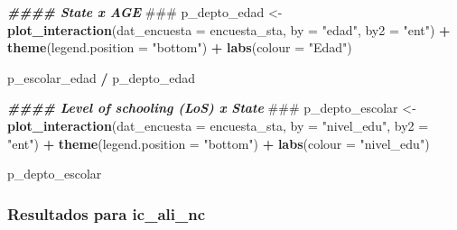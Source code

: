 \documentclass[
  12pt,
]{book}
\newenvironment{Shaded}{\begin{snugshade}}{\end{snugshade}}
\newcommand{\AlertTok}[1]{\textcolor[rgb]{0.94,0.16,0.16}{#1}}
\newcommand{\AttributeTok}[1]{\textcolor[rgb]{0.13,0.29,0.53}{#1}}
\newcommand{\DocumentationTok}[1]{\textcolor[rgb]{0.56,0.35,0.01}{\textbf{\textit{#1}}}}
\newcommand{\FunctionTok}[1]{\textcolor[rgb]{0.13,0.29,0.53}{\textbf{#1}}}
\newcommand{\NormalTok}[1]{#1}
\newcommand{\OtherTok}[1]{\textcolor[rgb]{0.56,0.35,0.01}{#1}}
\newcommand{\SpecialCharTok}[1]{\textcolor[rgb]{0.81,0.36,0.00}{\textbf{#1}}}
\newcommand{\StringTok}[1]{\textcolor[rgb]{0.31,0.60,0.02}{#1}}
\begin{document}
\begin{Shaded}
\begin{Highlighting}[]
\DocumentationTok{\#\#\#\# State x AGE }\AlertTok{\#\#\#}
\NormalTok{p\_depto\_edad }\OtherTok{\textless{}{-}}
  \FunctionTok{plot\_interaction}\NormalTok{(}\AttributeTok{dat\_encuesta =}\NormalTok{ encuesta\_sta,}
                   \AttributeTok{by =} \StringTok{"edad"}\NormalTok{,}
                   \AttributeTok{by2 =} \StringTok{"ent"}\NormalTok{) }\SpecialCharTok{+}
  \FunctionTok{theme}\NormalTok{(}\AttributeTok{legend.position =} \StringTok{"bottom"}\NormalTok{) }\SpecialCharTok{+} \FunctionTok{labs}\NormalTok{(}\AttributeTok{colour =} \StringTok{"Edad"}\NormalTok{)}

\NormalTok{p\_escolar\_edad }\SpecialCharTok{/}\NormalTok{ p\_depto\_edad}

\DocumentationTok{\#\#\#\# Level of schooling (LoS) x State }\AlertTok{\#\#\#}
\NormalTok{p\_depto\_escolar }\OtherTok{\textless{}{-}}
  \FunctionTok{plot\_interaction}\NormalTok{(}\AttributeTok{dat\_encuesta =}\NormalTok{ encuesta\_sta,}
                   \AttributeTok{by =} \StringTok{"nivel\_edu"}\NormalTok{,}
                   \AttributeTok{by2 =} \StringTok{"ent"}\NormalTok{) }\SpecialCharTok{+}
  \FunctionTok{theme}\NormalTok{(}\AttributeTok{legend.position =} \StringTok{"bottom"}\NormalTok{) }\SpecialCharTok{+} \FunctionTok{labs}\NormalTok{(}\AttributeTok{colour =} \StringTok{"nivel\_edu"}\NormalTok{)}

\NormalTok{p\_depto\_escolar}
\end{Highlighting}
\end{Shaded}

\hypertarget{resultados-para-ic_ali_nc}{%
\subsubsection*{Resultados para ic\_ali\_nc}\label{resultados-para-ic_ali_nc}}
\end{document}
